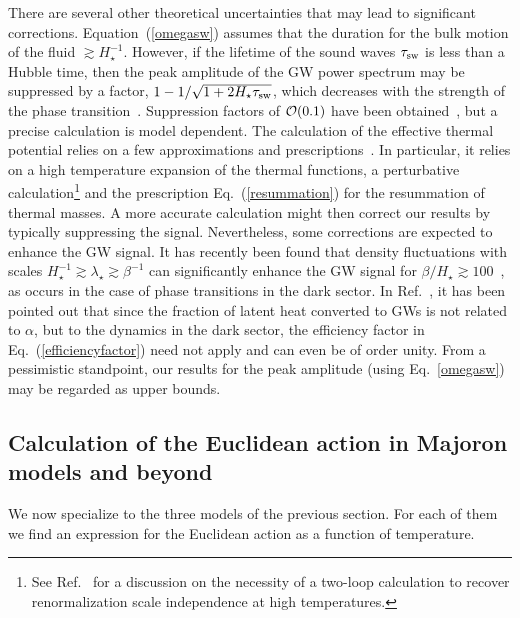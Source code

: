 \documentclass[a4paper,11pt]{article}
\begin{document}
There are several other theoretical uncertainties that 
may lead to significant corrections. 
Equation~(\ref{omegasw}) assumes that the duration for the bulk motion of the fluid $\gtrsim H_{\star}^{-1}$. However, if the
lifetime of the sound waves $\tau_{\rm sw}$ is less than a Hubble time, then the peak amplitude of the GW power spectrum may be suppressed by a factor, $1- 1/\sqrt{1+ 2H_{\star} \tau_{\rm sw}}$, which decreases with the strength of the phase transition~\cite{Caprini:2019egz,Ellis:2018mja,Guo:2020grp}. 
Suppression factors of ${\cal{O}}(0.1)$ have been obtained~\cite{Ellis:2018mja,Guo:2020grp},
but a precise calculation is  model dependent. %
The calculation of the
effective thermal potential relies on a few approximations and prescriptions~\cite{Croon:2020cgk}. 
In particular, it relies on a high temperature expansion of the thermal functions, a perturbative 
calculation\footnote{See Ref.~\cite{Gould:2021oba} for a discussion on the necessity of a two-loop calculation to
recover renormalization scale independence at high temperatures.}
and the prescription Eq.~(\ref{resummation}) for the resummation of thermal masses. A more accurate calculation 
might then correct our results by typically suppressing the signal. Nevertheless, some corrections are expected to enhance the GW signal.
It has  recently been found that density fluctuations with scales $H_\star^{-1 } \gtrsim \lambda_{\star} \gtrsim \beta^{-1}$ 
can significantly enhance the GW signal 
for $\beta/H_\star \gtrsim 100$~\cite{Jinno:2021ury}, as occurs in the case of phase transitions in the dark sector. In Ref.~\cite{Nakai:2020oit}, it has been pointed out that since the fraction of latent heat converted to GWs is not related to $\alpha$, but to the  dynamics in the dark sector, the 
efficiency factor in Eq.~(\ref{efficiencyfactor}) need not apply and can even be of order unity.
 From a pessimistic standpoint, our results for the peak amplitude (using  Eq.~\ref{omegasw}) may be regarded as upper bounds.



\subsection{Calculation of the Euclidean action in Majoron models and beyond}

We now specialize to the three models of the previous section. For each of them
we find an expression for the Euclidean action as a function of temperature.
\end{document}
